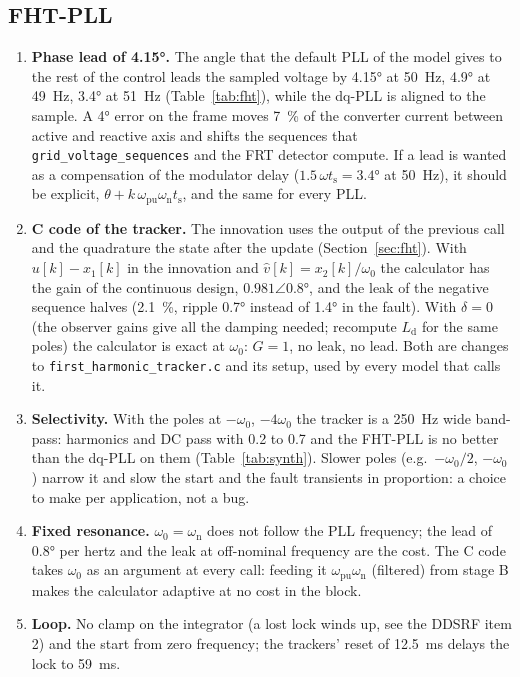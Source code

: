\documentclass[11pt,a4paper]{scrartcl}
\newcommand{\ped}[1]{_{\mathrm{#1}}}
\newcommand{\code}[1]{\texttt{#1}}
\begin{document}
\begin{onehalfspace}
\subsection{FHT-PLL}
\label{sec:critfht}

\begin{enumerate}
	\item \textbf{Phase lead of \ang{4.15}.} The angle that the default PLL of the model gives to the rest of the control leads the sampled voltage by \ang{4.15} at \SI{50}{\hertz}, \ang{4.9} at \SI{49}{\hertz}, \ang{3.4} at \SI{51}{\hertz} (Table~\ref{tab:fht}), while the dq-PLL is aligned to the sample. A \ang{4} error on the frame moves \num{7}~\% of the converter current between active and reactive axis and shifts the sequences that \code{grid\_voltage\_sequences} and the FRT detector compute. If a lead is wanted as a compensation of the modulator delay ($1.5\,\omega t\ped{s} = \ang{3.4}$ at \SI{50}{\hertz}), it should be explicit, $\theta + k\,\omega\ped{pu}\omega\ped{n} t\ped{s}$, and the same for every PLL.
	\item \textbf{C code of the tracker.} The innovation uses the output of the previous call and the quadrature the state after the update (Section~\ref{sec:fht}). With $u[k] - x_1[k]$ in the innovation and $\hat v[k] = x_2[k]/\omega_0$ the calculator has the gain of the continuous design, $0.981\angle\ang{0.8}$, and the leak of the negative sequence halves (\num{2.1}~\%, ripple \ang{0.7} instead of \ang{1.4} in the fault). With $\delta = 0$ (the observer gains give all the damping needed; recompute $L\ped{d}$ for the same poles) the calculator is exact at $\omega_0$: $G = 1$, no leak, no lead. Both are changes to \code{first\_harmonic\_tracker.c} and its setup, used by every model that calls it.
	\item \textbf{Selectivity.} With the poles at $-\omega_0$, $-4\omega_0$ the tracker is a \SI{250}{\hertz} wide band-pass: harmonics and DC pass with \num{0.2} to \num{0.7} and the FHT-PLL is no better than the dq-PLL on them (Table~\ref{tab:synth}). Slower poles (e.g.\ $-\omega_0/2$, $-\omega_0$) narrow it and slow the start and the fault transients in proportion: a choice to make per application, not a bug.
	\item \textbf{Fixed resonance.} $\omega_0 = \omega\ped{n}$ does not follow the PLL frequency; the lead of \ang{0.8} per hertz and the leak at off-nominal frequency are the cost. The C code takes $\omega_0$ as an argument at every call: feeding it $\omega\ped{pu}\omega\ped{n}$ (filtered) from stage B makes the calculator adaptive at no cost in the block.
	\item \textbf{Loop.} No clamp on the integrator (a lost lock winds up, see the DDSRF item 2) and the start from zero frequency; the trackers' reset of \SI{12.5}{\milli\second} delays the lock to \SI{59}{\milli\second}.
\end{enumerate}


\end{onehalfspace}
\end{document}
